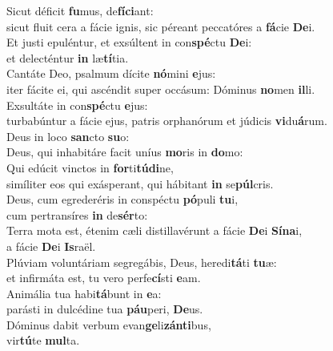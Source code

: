 \evenverse Sicut déficit \textbf{fu}mus, de\textbf{fí}\textbf{ci}ant:~\*\\
\evenverse sicut fluit cera a fácie ignis, sic péreant peccatóres a \textbf{fá}cie \textbf{De}i.\\
\oddverse Et justi epuléntur, et exsúltent in con\textbf{spé}ctu \textbf{De}i:~\*\\
\oddverse et delecténtur \textbf{in} læ\textbf{tí}tia.\\
\evenverse Cantáte Deo, psalmum dícite \textbf{nó}mini \textbf{e}jus:~\*\\
\evenverse iter fácite ei, qui ascéndit super occásum: Dóminus \textbf{no}men \textbf{il}li.\\
\oddverse Exsultáte in con\textbf{spé}ctu \textbf{e}jus:~\*\\
\oddverse turbabúntur a fácie ejus, patris orphanórum et júdicis \textbf{vi}du\textbf{á}rum.\\
\evenverse Deus in loco \textbf{san}cto \textbf{su}o:~\*\\
\evenverse Deus, qui inhabitáre facit uníus \textbf{mo}ris in \textbf{do}mo:\\
\oddverse Qui edúcit vinctos in \textbf{for}ti\textbf{tú}\textbf{di}ne,~\*\\
\oddverse simíliter eos qui exásperant, qui hábitant \textbf{in} se\textbf{púl}cris.\\
\evenverse Deus, cum egrederéris in conspéctu \textbf{pó}puli \textbf{tu}i,~\*\\
\evenverse cum pertransíres \textbf{in} de\textbf{sér}to:\\
\oddverse Terra mota est, étenim cæli distillavérunt a fácie \textbf{De}i \textbf{Sí}\textbf{na}i,~\*\\
\oddverse a fácie \textbf{De}i \textbf{Is}raël.\\
\evenverse Plúviam voluntáriam segregábis, Deus, heredi\textbf{tá}ti \textbf{tu}æ:~\*\\
\evenverse et infirmáta est, tu vero perfe\textbf{cí}sti \textbf{e}am.\\
\oddverse Animália tua habi\textbf{tá}bunt in \textbf{e}a:~\*\\
\oddverse parásti in dulcédine tua \textbf{páu}peri, \textbf{De}us.\\
\evenverse Dóminus dabit verbum evan\textbf{ge}li\textbf{zán}\textbf{ti}bus,~\*\\
\evenverse vir\textbf{tú}te \textbf{mul}ta.\\
